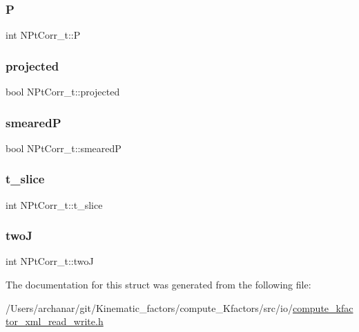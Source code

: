 \subsubsection{\texorpdfstring{P}{P}}
{\footnotesize\ttfamily int N\+Pt\+Corr\+\_\+t\+::P}

\mbox{\label{structNPtCorr__t_a7b43815d3255674390104430367f8682}} 
\subsubsection{\texorpdfstring{projected}{projected}}
{\footnotesize\ttfamily bool N\+Pt\+Corr\+\_\+t\+::projected}

\mbox{\label{structNPtCorr__t_a82915520d12ede08a75c16a323fc5c30}} 
\subsubsection{\texorpdfstring{smearedP}{smearedP}}
{\footnotesize\ttfamily bool N\+Pt\+Corr\+\_\+t\+::smearedP}

\mbox{\label{structNPtCorr__t_a30a953f2e6afa7c01c37b8eff4447524}} 
\subsubsection{\texorpdfstring{t\_slice}{t\_slice}}
{\footnotesize\ttfamily int N\+Pt\+Corr\+\_\+t\+::t\+\_\+slice}

\mbox{\label{structNPtCorr__t_aa39375785267f2180d4131de79f6c5b4}} 
\subsubsection{\texorpdfstring{twoJ}{twoJ}}
{\footnotesize\ttfamily int N\+Pt\+Corr\+\_\+t\+::twoJ}



The documentation for this struct was generated from the following file\+:\begin{DoxyCompactItemize}
\item 
/\+Users/archanar/git/\+Kinematic\+\_\+factors/compute\+\_\+\+Kfactors/src/io/\mbox{\hyperlink{compute__kfactor__xml__read__write_8h}{compute\+\_\+kfactor\+\_\+xml\+\_\+read\+\_\+write.\+h}}\end{DoxyCompactItemize}
